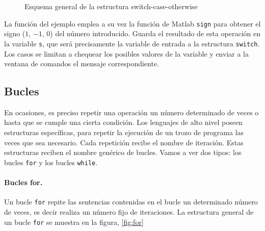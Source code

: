 
\begin{figure}[h]
\centering
{}
\caption{Esquema general de la estructura switch-case-otherwise}
\label{fig:switch}
\end{figure}

La función del ejemplo emplea a su vez la función de Matlab \texttt{sign} para obtener el signo ($1$, $-1$, $0$) del número introducido. Guarda el resultado de esta operación en la variable \texttt{s}, que será precisamente la variable de entrada a la estructura \texttt{switch}. Los casos se limitan a chequear los posibles valores de la variable y enviar a la ventana de comandos el mensaje correspondiente.
 
\subsection{Bucles}
En ocasiones, es preciso repetir una operación un número determinado de veces o hasta que se cumple una cierta condición. Los lenguajes de alto nivel poseen estructuras específicas, para repetir la ejecución de un trozo de programa las veces que sea necesario. Cada repetición recibe el nombre de iteración. Estas estructuras reciben el nombre genérico de bucles. Vamos a ver dos tipos: los bucles \texttt{for} y los bucles \texttt{while}.

\paragraph{Bucles for.} Un bucle \texttt{for} repite las sentencias contenidas en el bucle un determinado número de veces, es decir realiza un número fijo de iteraciones. La estructura general de un bucle \texttt{for} se muestra en la figura, \ref{fig:for}

